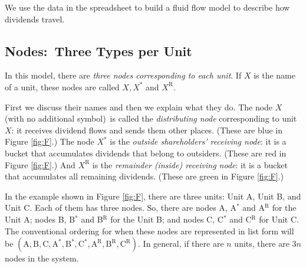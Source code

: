 \documentclass[a4paper,12pt,reqno]{amsart}
\theoremstyle{definition} \newtheorem{example}{Example}
\theoremstyle{definition} \newtheorem{condition}{Condition}
\theoremstyle{definition} \newtheorem{corollary}{Corollary}
\theoremstyle{definition} \newtheorem{claim}{Claim}
\theoremstyle{definition} \newtheorem{definition}{Definition}
\theoremstyle{definition} \newtheorem{conjecture}{Conjecture}
\theoremstyle{definition} \newtheorem{lemma}{Lemma}
\theoremstyle{definition} \newtheorem{theorem}{Theorem}
\theoremstyle{definition} \newtheorem*{theoremNoNumber}{Theorem}
\theoremstyle{definition} \newtheorem*{lemmaCorrespondence}{Lemma \ref{lem:correspondence}}
\theoremstyle{definition}\newtheorem{proposition}{Proposition}
\theoremstyle{definition} \newtheorem{result}{Result}
\theoremstyle{definition} \newtheorem*{definitionNoNumber}{Definition}
\theoremstyle{definition} \newtheorem{assumption}{Assumption}
\theoremstyle{definition} \newtheorem*{assumptionNoNumber}{Assumption}
\theoremstyle{definition} \newtheorem*{fact}{Fact}
\theoremstyle{definition} \newtheorem*{property}{Property}
\theoremstyle{definition} \newtheorem{remark}{Remark}
\begin{document}
We use the data in the spreadsheet to build a  fluid flow model to describe how dividends travel. 


\subsection{Nodes:\ Three Types per Unit}

In this model, there are \emph{three nodes corresponding to each unit}. If $X$ is the name of a unit, these nodes are called $X, X^*$ and $X^\text{R}$. 

First we discuss their names and then we explain what they do. The node $X$ (with no additional symbol)\ is called the \emph{distributing node} corresponding to unit $X$: it receives dividend flows and sends them other places. (These are blue in Figure \ref{fig:F}.) The node $X^*$ is the \emph{outside shareholders' receiving node}: it is a bucket that accumulates dividends that belong to outsiders. (These are red in Figure \ref{fig:F}.) And $X^\text{R}$ is the \emph{remainder (inside) receiving node}: it is a bucket that accumulates all remaining dividends. (These are green in Figure \ref{fig:F}.) 

In the example shown in Figure \ref{fig:F}, there are three units: Unit A, Unit B, and Unit C. Each of them has three nodes. So, there are nodes A, A$^*$ and A$^\text{R}$ for the Unit A;  nodes B, B$^*$ and B$^\text{R}$ for the Unit B; and nodes C, C$^*$ and C$^\text{R}$ for Unit C. The conventional ordering for when these nodes are represented in list form will be $(\text{A},\text{B}, \text{C},\text{A}^*,\text{B}^*, \text{C}^*, \text{A}^\text{R},\text{B}^\text{R}, \text{C}^\text{R})$. In general, if there are $n$ units, there are $3n$ nodes in the system.
\end{document}
